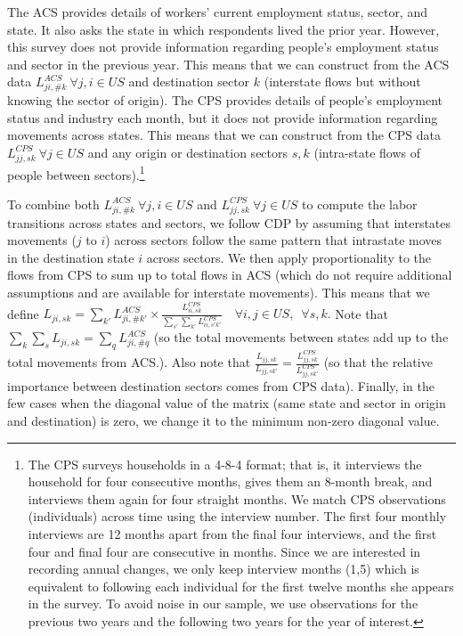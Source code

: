 \documentclass[12pt]{article}
\begin{document}
The ACS provides details of workers' current employment status, sector, and state. It also asks the state in which respondents lived the prior year. However, this survey does not provide information regarding people's employment status and sector in the previous year. This means that we can construct from the ACS data \(L^{ACS}_{ji,\#k}\:\forall j,i\in US\) and
destination sector $k$ (interstate flows but without knowing the sector of origin). The CPS  provides details of people's employment status and industry each month, but it does not provide information regarding movements across states. This means that we can construct from the CPS data \(L^{CPS}_{jj,sk}\:\forall j\in US\) and any origin or destination sectors $s,k$ (intra-state flows of people between sectors).\footnote{The CPS surveys households in a 4-8-4 format; that is, it interviews the household for four consecutive months, gives them an 8-month break, and interviews them again for four straight months. We match CPS observations (individuals) across time using the interview number. The first four monthly interviews are 12 months apart from the final four interviews, and the first four and final four are consecutive in months. Since we are interested in recording annual changes, we only keep interview months (1,5) which is equivalent to following each individual for the first twelve months she appears in the survey. To avoid noise in our sample, we use observations for the previous two years and the following two years for the year of interest.} 

To combine both $L^{ACS}_{ji,\#k}\:\forall j,i\in US$ and $L^{CPS}_{jj,sk} \:\forall j\in US$ to compute the labor transitions across states
and sectors, we follow CDP by assuming that interstates movements ($j$ to $i$) across sectors follow the same pattern that intrastate moves in the destination state $i$ across sectors. We then apply proportionality to the flows from CPS to sum up to total flows in ACS (which do not require additional assumptions and are available for interstate movements). This means that we define  $L_{ji,sk}=\sum_{k'}L^{ACS}_{ji,\#k'}\times\tfrac{L^{CPS}_{ii,sk}}{\sum_{s'}\sum_{k'}L^{CPS}_{ii,s'k'}} \quad \forall i,j\in US,\; \:\forall s,k.$ Note that \(\sum_{k}\sum_{s}L_{ji,sk}=\sum_{q}L^{ACS}_{ji,\#q}\) (so the
total movements between states add up to the total movements from ACS.). Also note that
$\frac{L_{jj,sk}}{L_{jj,sk'}}=\frac{L^{CPS}_{jj,sk}}{L^{CPS}_{jj,sk'}}$ (so that the relative importance between destination sectors comes from CPS data). Finally, in the few cases when the diagonal value of the matrix (same state and sector in origin and destination) is zero, we change it to the minimum non-zero diagonal value. 
\end{document}
